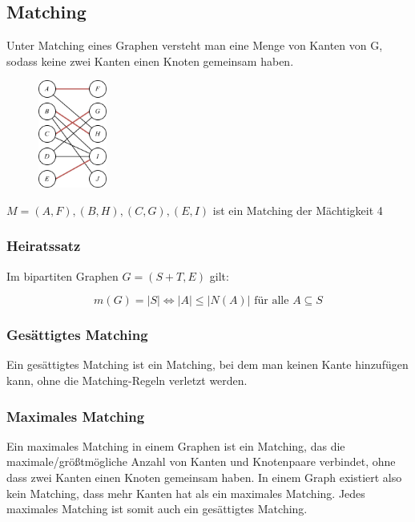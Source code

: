 \subsection{Matching}

Unter Matching eines Graphen versteht man eine Menge von Kanten von G, sodass keine zwei Kanten einen Knoten gemeinsam haben.

\begin{figure}[h]
\centering
\includegraphics[width=0.2\textwidth]{graphics/graph_matching.png}
\end{figure}

$M = {(A,F), (B,H), (C,G), (E,I)}$ ist ein Matching der Mächtigkeit 4

\subsubsection*{Heiratssatz}

Im bipartiten Graphen $G = (S + T, E)$ gilt:

$$
m(G) = |S| \Leftrightarrow |A| \leq |N (A)| \text{ für alle } A \subseteq S
$$

\subsubsection*{Gesättigtes Matching}

Ein gesättigtes Matching ist ein Matching, bei dem man keinen Kante hinzufügen kann, ohne die Matching-Regeln verletzt werden.

\subsubsection*{Maximales Matching}

Ein maximales Matching in einem Graphen ist ein Matching, das die maximale/größtmögliche Anzahl von Kanten und Knotenpaare verbindet, ohne dass zwei Kanten einen Knoten gemeinsam haben. In einem Graph existiert also kein Matching, dass mehr Kanten hat als ein maximales Matching. Jedes maximales Matching ist somit auch ein gesättigtes  Matching.

